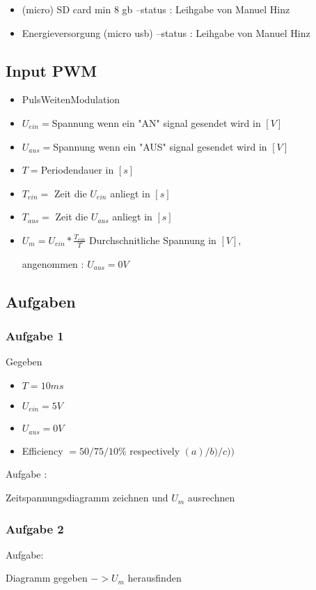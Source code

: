 \documentclass{article}
\begin{document}
\begin{itemize}

\item (micro) SD card min 8 gb --status : Leihgabe von Manuel Hinz

\item Energieversorgung (micro usb) --status : Leihgabe von Manuel Hinz

\end{itemize}

\subsection{Input PWM}

\begin{itemize}

\item PulsWeitenModulation

\item $U_{ein} = $Spannung wenn ein "AN" signal gesendet wird in $[V]$

\item $U_{aus} = $Spannung wenn ein "AUS" signal gesendet wird in $[V]$

\item $T = $Periodendauer in $[s]$

\item $T_{ein} = $ Zeit die $U_{ein}$ anliegt in $[s]$

\item $T_{aus} = $ Zeit die $U_{aus}$ anliegt in $[s]$

\item $U_m = U_{ein} * \frac{T_{ein}}{T}$ Durchschnitliche Spannung in $[V]$, 

angenommen : $U_{aus} = 0V$

\end{itemize}

\subsection{Aufgaben}

\subsubsection{Aufgabe 1} 

Gegeben
\begin{itemize}

\item $T = 10ms$

\item $U_{ein} = 5V$

\item $U_{aus} = 0V$

\item Efficiency $= 50/75/10 \%$ respectively $(a)/b)/c))$

\end{itemize}
 
Aufgabe : 

Zeitspannungsdiagramm zeichnen und $U_m$ ausrechnen

\subsubsection{Aufgabe 2}

Aufgabe: 

Diagramm gegeben $-> U_m$ herausfinden
\end{document}
